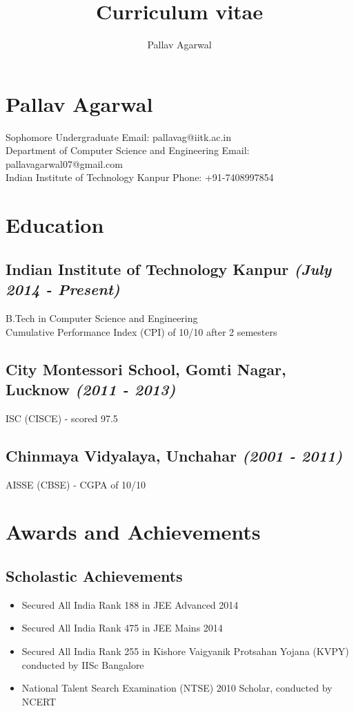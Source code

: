 \documentclass[8pt]{extreport}
\title{Curriculum vitae}
\author{Pallav Agarwal }
\begin{document}
    \section*{\huge{Pallav Agarwal}\\}
        Sophomore Undergraduate \hfill Email: pallavag@iitk.ac.in \\
        Department of Computer Science and Engineering \hfill Email: pallavagarwal07@gmail.com \\
        Indian Institute of Technology Kanpur \hfill Phone: +91-7408997854
    \section*{Education}
        \hrulefill
        \subsection*{Indian Institute of Technology Kanpur \hfill \textit{\small{(July 2014 - Present)}}}
            B.Tech in Computer Science and Engineering \\
            Cumulative Performance Index (CPI) of 10/10 after 2 semesters
        \subsection*{City Montessori School, Gomti Nagar, Lucknow \hfill \textit{\small{(2011 - 2013)}}}
            ISC (CISCE) - scored 97.5%
        \subsection*{Chinmaya Vidyalaya, Unchahar \hfill \textit{\small{(2001 - 2011)}}}
            AISSE (CBSE) - CGPA of 10/10
    \section*{Awards and Achievements}
        \hrulefill
        \subsection*{Scholastic Achievements}
        \begin{itemize}
            \item Secured All India Rank 188 in JEE Advanced 2014
            \item Secured All India Rank 475 in JEE Mains 2014
            \item Secured All India Rank 255 in Kishore Vaigyanik Protsahan Yojana (KVPY) conducted by IISc Bangalore
            \item National Talent Search Examination (NTSE) 2010 Scholar, conducted by NCERT
        \end{itemize}
\end{document}

